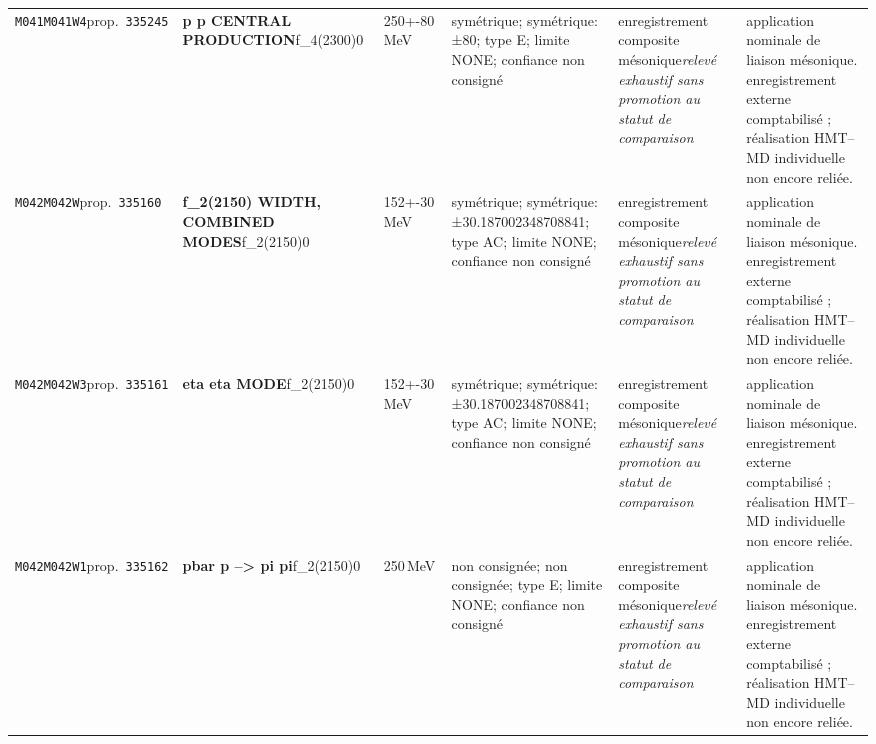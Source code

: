 \begin{landscape}
\begin{longtable}{L{1.85cm}L{4.45cm}L{2.35cm}L{4.05cm}L{3.35cm}L{7.15cm}}
\texttt{M041}\newline \texttt{M041W4}\newline prop.\ \texttt{335245} & \textbf{p p CENTRAL PRODUCTION}\newline f\_\allowbreak{}4(2300)0 & 250+-80\,MeV & symétrique; symétrique: ±80; type E; limite NONE; confiance non consigné & enregistrement composite mésonique\newline \emph{relevé exhaustif sans promotion au statut de comparaison} & application nominale de liaison mésonique. enregistrement externe comptabilisé ; réalisation HMT--MD individuelle non encore reliée. \\
\texttt{M042}\newline \texttt{M042W}\newline prop.\ \texttt{335160} & \textbf{f\_\allowbreak{}2(2150) WIDTH, COMBINED MODES}\newline f\_\allowbreak{}2(2150)0 & 152+-30\,MeV & symétrique; symétrique: ±30.187002348708841; type AC; limite NONE; confiance non consigné & enregistrement composite mésonique\newline \emph{relevé exhaustif sans promotion au statut de comparaison} & application nominale de liaison mésonique. enregistrement externe comptabilisé ; réalisation HMT--MD individuelle non encore reliée. \\
\texttt{M042}\newline \texttt{M042W3}\newline prop.\ \texttt{335161} & \textbf{eta eta MODE}\newline f\_\allowbreak{}2(2150)0 & 152+-30\,MeV & symétrique; symétrique: ±30.187002348708841; type AC; limite NONE; confiance non consigné & enregistrement composite mésonique\newline \emph{relevé exhaustif sans promotion au statut de comparaison} & application nominale de liaison mésonique. enregistrement externe comptabilisé ; réalisation HMT--MD individuelle non encore reliée. \\
\texttt{M042}\newline \texttt{M042W1}\newline prop.\ \texttt{335162} & \textbf{pbar p --\textgreater{} pi pi}\newline f\_\allowbreak{}2(2150)0 & 250\,MeV & non consignée; non consignée; type E; limite NONE; confiance non consigné & enregistrement composite mésonique\newline \emph{relevé exhaustif sans promotion au statut de comparaison} & application nominale de liaison mésonique. enregistrement externe comptabilisé ; réalisation HMT--MD individuelle non encore reliée. \\

\end{longtable}
\end{landscape}
